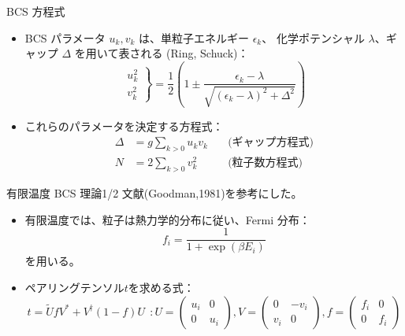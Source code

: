 \documentclass[aspectratio=169, 12pt, dvipdfmx]{beamer}
\begin{document}
\begin{frame}{BCS 方程式}
  \begin{itemize}
    \item BCS パラメータ \( u_k, v_k \) は、単粒子エネルギー \( \epsilon_k \)、
    化学ポテンシャル \( \lambda \)、ギャップ \( \Delta \) を用いて表される 
    \cite{thenuclearmanybody}(Ring, Schuck)：
      \[
      \left.
      \begin{aligned}
        u_k^2\\
        v_k^2
      \end{aligned}
      \right\}
      = \frac{1}{2} \left( 1 \pm \frac{\epsilon_k - \lambda}{\sqrt{(\epsilon_k - \lambda)^2 + \Delta^2}} \right)
      \]
    \item これらのパラメータを決定する方程式：
      \begin{align}
        \Delta  &=  g\sum_{k>0} u_k v_k \quad &\text{(ギャップ方程式)} \label{Gap T=0} \\
        N       &=  2\sum_{k>0} v_k^2 \quad &\text{(粒子数方程式)} \label{number T=0}
      \end{align}
  \end{itemize}
\end{frame}

\begin{frame}{有限温度 BCS 理論1/2}
  文献\cite{goodman1981finite}(Goodman,1981)を参考にした。
  \begin{itemize}
    \item 有限温度では、粒子は熱力学的分布に従い、Fermi 分布：
      \[
      f_i = \frac{1}{1 + \exp(\beta E_i)}
      \]
      を用いる。
    \item ペアリングテンソル\(t\)を求める式：
    \[
    t=\tilde{U}fV^* + V^{\dagger}(1-f)U\ \ :
    U=
    \begin{pmatrix}
      u_i & 0 \\
      0 & u_i
    \end{pmatrix},
    V=
    \begin{pmatrix}
      0 & -v_i \\
      v_i & 0
    \end{pmatrix},
    f=
    \begin{pmatrix}
      f_i & 0 \\
      0 & f_i
    \end{pmatrix}
    \]
  \end{itemize}
\end{frame}
\end{document}
